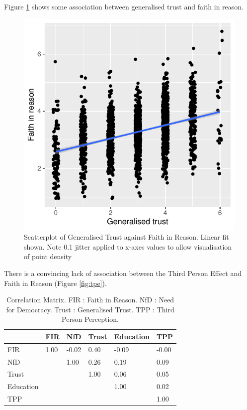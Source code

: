 \documentclass[
  ,jou,floatsintext]{apa6}
\begin{document}
Figure \ref{fig:generalisetrust} shows some association between generalised trust and faith in reason.

\begin{figure}

{\centering \includegraphics[width=0.75\linewidth]{faithinreason_files/figure-latex/generalisetrust-1} 

}

\caption{Scatterplot of Generalised Trust against Faith in Reason. Linear fit shown. Note 0.1 jitter applied to x-axes values to allow visualisation of point density}\label{fig:generalisetrust}
\end{figure}

There is a convincing lack of association between the Third Person Effect and Faith in Reason (Figure \ref{fig:tpe}).

\begin{table}

\caption{\label{tab:cortable}Correlation Matrix. FIR : Faith in Reason. NfD : Need for Democracy. Trust : Generalised Trust. TPP : Third Person Perception.}
\centering
\begin{tabular}[t]{l|l|l|l|l|l}
\hline
  & FIR  & NfD  & Trust  & Education  & TPP \\
\hline
FIR & 1.00 & -0.02 & 0.40 & -0.09 & -0.00\\
\hline
NfD &  & 1.00 & 0.26 & 0.19 & 0.09\\
\hline
Trust &  &  & 1.00 & 0.06 & 0.05\\
\hline
Education &  &  &  & 1.00 & 0.02\\
\hline
TPP &  &  &  &  & 1.00\\
\hline
\end{tabular}
\end{table}
\end{document}
